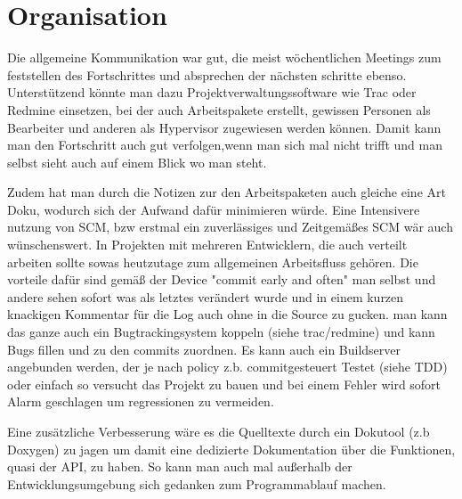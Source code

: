 \section{Organisation}

Die allgemeine Kommunikation war gut, die meist w\"ochentlichen Meetings zum feststellen des Fortschrittes und absprechen der n\"achsten schritte ebenso. Unterst\"utzend k\"onnte man dazu Projektverwaltungssoftware wie Trac oder Redmine einsetzen, bei der auch Arbeitspakete erstellt, gewissen Personen als Bearbeiter und anderen als Hypervisor zugewiesen werden k\"onnen. Damit kann man den Fortschritt auch gut verfolgen,wenn man sich mal nicht trifft und man selbst sieht auch auf einem Blick wo man steht.

Zudem hat man durch die Notizen zur den Arbeitspaketen auch gleiche eine Art Doku, wodurch sich der Aufwand daf\"ur minimieren w\"urde.
Eine Intensivere nutzung von SCM,  bzw erstmal ein zuverl\"assiges und Zeitgem\"a{\ss}es SCM w\"ar auch w\"unschenswert. In Projekten mit mehreren Entwicklern, die auch verteilt arbeiten sollte sowas heutzutage zum allgemeinen Arbeitsfluss geh\"oren. 
Die vorteile daf\"ur sind  gem\"a{\ss} der Device "commit early and often" man selbst und andere sehen sofort was als letztes ver\"andert wurde und in einem kurzen knackigen Kommentar f\"ur die Log auch ohne in die Source zu gucken. man kann das ganze auch ein Bugtrackingsystem koppeln (siehe trac/redmine) und kann Bugs fillen und zu den commits zuordnen. Es kann auch ein Buildserver angebunden werden, der je nach policy  z.b. commitgesteuert Testet (siehe TDD) oder einfach so versucht das Projekt zu bauen und bei einem Fehler wird sofort Alarm geschlagen um regressionen zu vermeiden.

Eine zus\"atzliche Verbesserung w\"are es die Quelltexte durch ein Dokutool (z.b Doxygen) zu jagen um damit eine dedizierte Dokumentation \"uber die Funktionen, quasi der API, zu haben. So kann man auch mal au{\ss}erhalb der Entwicklungsumgebung sich gedanken zum Programmablauf machen.